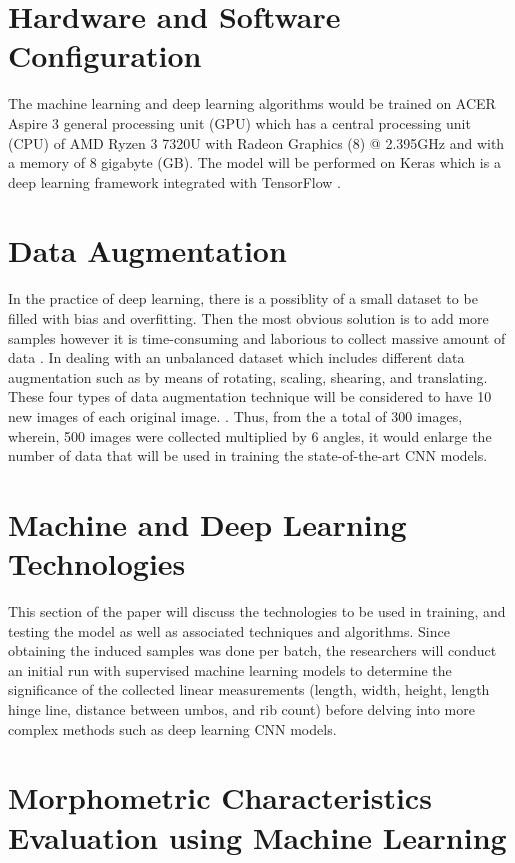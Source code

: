 \section{Hardware and Software Configuration}
The machine learning and deep learning algorithms would be trained on ACER Aspire 3 general processing unit (GPU) which has a central processing unit (CPU) of  AMD Ryzen 3 7320U with Radeon Graphics (8) @ 2.395GHz and with a memory of 8 gigabyte (GB). The model will be performed on Keras which is a deep learning framework integrated with TensorFlow \cite{cui2020}.

\section{Data Augmentation}
In the practice of deep learning, there is a possiblity of a small dataset to be filled with bias and overfitting. Then the most obvious solution is to add more samples however it is time-consuming and laborious to collect massive amount of data . In dealing with an unbalanced dataset which includes different data augmentation such as by means of rotating, scaling, shearing, and translating. These four types of data augmentation technique will be considered to have 10 new images of each original image. \cite{cui2020}. Thus, from the a total of 300 images, wherein, 500 images were collected multiplied by 6 angles, it would enlarge the number of data that will be used in training the state-of-the-art CNN models. 

\section{Machine and Deep Learning Technologies}

This section of the paper will discuss the technologies to be used in training, and testing the model as well as associated techniques and algorithms.  Since obtaining the induced samples was done per batch, the researchers will conduct an initial run with supervised machine learning models to determine the significance of the collected linear measurements (length, width, height, length hinge line, distance between umbos, and rib count) before delving into more complex methods such as deep learning CNN models. 

\section{Morphometric Characteristics Evaluation using Machine Learning }
\label{sec:ml models}

